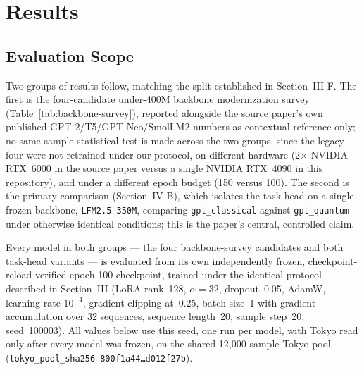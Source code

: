 
\section{Results}

\subsection{Evaluation Scope}

Two groups of results follow, matching the split established in Section~III-F. The first is the four-candidate under-400M backbone modernization survey (Table~\ref{tab:backbone-survey}), reported alongside the source paper's own published GPT-2/T5/GPT-Neo/SmolLM2 numbers as contextual reference only; no same-sample statistical test is made across the two groups, since the legacy four were not retrained under our protocol, on different hardware (2$\times$ NVIDIA RTX~6000 in the source paper versus a single NVIDIA RTX~4090 in this repository), and under a different epoch budget (150 versus 100). The second is the primary comparison (Section~IV-B), which isolates the task head on a single frozen backbone, \texttt{LFM2.5-350M}, comparing \texttt{gpt\_classical} against \texttt{gpt\_quantum} under otherwise identical conditions; this is the paper's central, controlled claim.

Every model in both groups --- the four backbone-survey candidates and both task-head variants --- is evaluated from its own independently frozen, checkpoint-reload-verified epoch-100 checkpoint, trained under the identical protocol described in Section~III (LoRA rank~128, $\alpha=32$, dropout~0.05, AdamW, learning rate $10^{-4}$, gradient clipping at~0.25, batch size~1 with gradient accumulation over 32 sequences, sequence length~20, sample step~20, seed~100003). All values below use this seed, one run per model, with Tokyo read only after every model was frozen, on the shared 12{,}000-sample Tokyo pool (\texttt{tokyo\_pool\_sha256}~\texttt{800f1a44\ldots d012f27b}).

